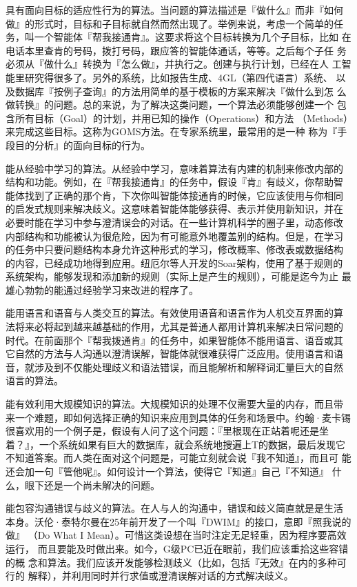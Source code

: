 \documentclass[12pt,a4paper]{article}
\begin{document}
具有面向目标的适应性行为的算法。当问题的算法描述是『做什么』而非『如何
做』的形式时，目标和子目标就自然而然出现了。举例来说，考虑一个简单的任
务，叫一个智能体『帮我接通肯』。这要求将这个目标转换为几个子目标，比如
在电话本里查肯的号码，拨打号码，跟应答的智能体通话，等等。之后每个子任
务必须从『做什么』转换为『怎么做』，并执行之。创建与执行计划，已经在人
工智能里研究得很多了。另外的系统，比如报告生成、4GL（第四代语言）系统、
以及数据库『按例子查询』的方法用简单的基于模板的方案来解决『做什么到怎
么做转换』的问题。总的来说，为了解决这类问题，一个算法必须能够创建一个
包含所有目标（Goal）的计划，并用已知的操作（Operations）和方法
（Methods）来完成这些目标。这称为GOMS方法。在专家系统里，最常用的是一种
称为『手段目的分析』的面向目标的行为。

能从经验中学习的算法。从经验中学习，意味着算法有内建的机制来修改内部的
结构和功能。例如，在『帮我接通肯』的任务中，假设『肯』有歧义，你帮助智
能体找到了正确的那个肯，下次你叫智能体接通肯的时候，它应该使用与你相同
的启发式规则来解决歧义。这意味着智能体能够获得、表示并使用新知识，并在
必要时能在学习中参与澄清误会的对话。在一些计算机科学的圈子里，动态修改
内部结构和功能被认为很危险，因为有可能意外地覆盖别的结构。但是，在学习
的任务中只要问题结构本身允许这种形式的学习，修改概率、修改表或数据结构
的内容，已经成功地得到应用。纽厄尔等人开发的Soar架构，使用了基于规则的
系统架构，能够发现和添加新的规则（实际上是产生的规则），可能是迄今为止
最雄心勃勃的能通过经验学习来改进的程序了。

能用语言和语音与人类交互的算法。有效使用语音和语言作为人机交互界面的算
法将来必将起到越来越基础的作用，尤其是普通人都用计算机来解决日常问题的
时代。在前面那个『帮我拨通肯』的任务中，如果智能体不能用语言、语音或其
它自然的方法与人沟通以澄清误解，智能体就很难获得广泛应用。使用语言和语
音，就涉及到不仅能处理歧义和语法错误，而且能解析和解释词汇量巨大的自然
语言的算法。

能有效利用大规模知识的算法。大规模知识的处理不仅需要大量的内存，而且带
来一个难题，即如何选择正确的知识来应用到具体的任务和场景中。约翰·麦卡锡
很喜欢用的一个例子是，假设有人问了这个问题：『里根现在正站着呢还是坐
着？』，一个系统如果有巨大的数据库，就会系统地搜遍上T的数据，最后发现它
不知道答案。而人类在面对这个问题是，可能立刻就会说『我不知道』，而且可
能还会加一句『管他呢』。如何设计一个算法，使得它『知道』自己『不知道』
什么，眼下还是一个尚未解决的问题。

能包容沟通错误与歧义的算法。在人与人的沟通中，错误和歧义简直就是是生活
本身。沃伦·泰特尔曼在25年前开发了一个叫『DWIM』的接口，意即『照我说的做』
（Do What I Mean）。可惜这类设想在当时注定无足轻重，因为程序要高效运行，
而且要能及时做出来。如今，G级PC已近在眼前，我们应该重拾这些容错的概
念和算法。我们应该开发能够检测歧义（比如，包括『无效』在内的多种可行的
解释），并利用同时并行求值或澄清误解对话的方式解决歧义。
\end{document}
